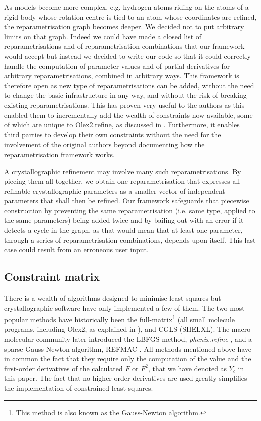 \documentclass[pdf]{iucr}
\begin{document}
As models become more complex, e.g. hydrogen atoms riding on the atoms of a rigid body whose rotation centre is tied to an atom whose coordinates are refined, the reparametrisation graph becomes deeper. We decided not to put arbitrary limits on that graph. Indeed we could have made a closed list of reparametrisations and of reparametrisation combinations  that our framework would accept but instead we decided to write our code so that it could correctly handle the computation of parameter values and of partial derivatives for arbitrary reparametrisations, combined in arbitrary ways. This framework is therefore open as new type of reparametrisations can be added, without the need to change the basic infrastructure in any way, and without the risk of breaking existing reparametrisations. This has proven very useful to the authors as this enabled them to incrementally add the wealth of constraints now available, some of which are unique to Olex2.refine, as discussed in . Furthermore, it enables third parties to develop their own constraints without the need for the involvement of the original authors beyond documenting how the reparametrisation framework works.

A crystallographic refinement may involve many such reparametrisations. By piecing them all together, we obtain one reparametrisation that expresses all refinable crystallographic parameters as a smaller vector of independent parameters that shall then be refined. Our framework safeguards that piecewise construction by preventing the same reparametrisation (i.e. same type, applied to the same parameters) being added twice and by bailing out with an error if it detects a cycle in the graph, as that would mean that at least one parameter, through a series of reparametrisation combinations, depends upon itself. This last case could  result from an erroneous user input.

\subsection{Constraint matrix}

There is a wealth of algorithms designed to minimise least-squares but crystallographic software have only implemented a few of them. The two most popular methods have historically been the full-matrix\footnote{This method is also known as the Gauss-Newton algorithm.} (all small molecule programs, including Olex2, as explained in ), and CGLS (SHELXL).  The macro-molecular community later introduced the LBFGS method, \emph{phenix.refine} \cite{Afonine:2012aa}, and a sparse Gauss-Newton algorithm, REFMAC \cite[section 4 and references therein]{Murshudov:2011aa}. All methods mentioned above have in common the fact that they require only the computation of the value and the first-order derivatives of the calculated $F$ or $F^2$, that we have denoted as $Y_c$ in this paper. The fact that no higher-order derivatives are used greatly simplifies the implementation of constrained least-squares.
\end{document}
